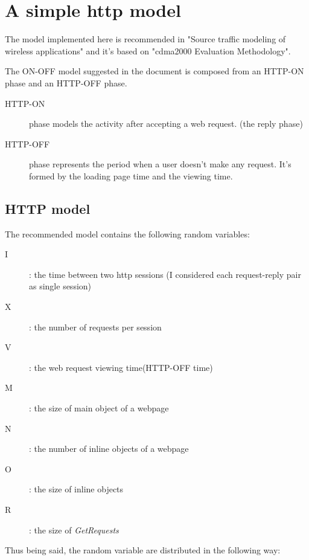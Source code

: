 %
\section{A simple http model}

 The model implemented here is recommended in "Source traffic modeling of wireless applications" and it's based on "cdma2000 Evaluation Methodology".

The ON-OFF model suggested in the document is composed from an HTTP-ON phase and an HTTP-OFF phase.
\begin{description}
 \item[HTTP-ON] phase models the activity after accepting a web request. (the reply phase)
 \item[HTTP-OFF] phase represents the period when a user doesn't make any request. It's formed by the loading page time and the viewing time.
\end{description}

\subsection{HTTP model}

The recommended model contains the following random variables:

\begin{description}
 \item[I]: the time between two http sessions (I considered each request-reply pair as single session)
 \item[X]: the number of requests per session
 \item[V]: the web request viewing time(HTTP-OFF time)
 \item[M]: the size of main object of a webpage
 \item[N]: the number of inline objects of a webpage
 \item[O]: the size of inline objects
 \item[R]: the size of \textit{GetRequests}

\end{description}
Thus being said, the random variable are distributed in the following way:

